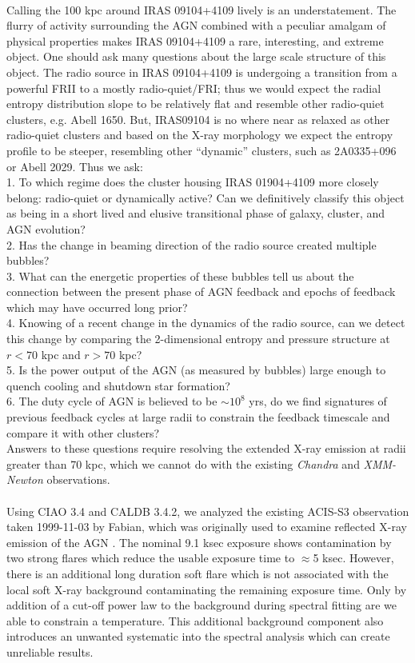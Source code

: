 \documentclass[letterpaper,11pt,twocolumn]{article}
\begin{document}
\\
Calling the 100 kpc around IRAS 09104+4109 lively is an
understatement. The flurry of activity surrounding the AGN combined
with a peculiar amalgam of physical properties makes IRAS 09104+4109 a
rare, interesting, and extreme object. One should ask many questions
about the large scale structure of this object. The radio source in
IRAS 09104+4109 is undergoing a transition from a powerful FRII to a
mostly radio-quiet/FRI; thus we would expect the radial entropy
distribution slope to be relatively flat and resemble other
radio-quiet clusters, e.g. Abell 1650. But, IRAS09104 is no where near
as relaxed as other radio-quiet clusters and based on the X-ray
morphology we expect the entropy profile to be steeper, resembling
other ``dynamic'' clusters, such as 2A0335+096 or Abell 2029. Thus we
ask:\\
1. To which regime does the cluster housing IRAS 01904+4109 more
closely belong: radio-quiet or dynamically active? Can we definitively
classify this object as being in a short lived and elusive
transitional phase of galaxy, cluster, and AGN evolution?\\
2. Has the change in beaming direction of the radio source created
multiple bubbles?\\
3. What can the energetic properties of these bubbles
tell us about the connection between the present phase of AGN feedback
and epochs of feedback which may have occurred long prior?\\
4. Knowing of a recent change in the dynamics of the radio source, can
we detect this change by comparing the 2-dimensional entropy and
pressure structure at $r < 70$ kpc and $r > 70$ kpc?\\
5. Is the power output of the AGN (as measured by bubbles) large
enough to quench cooling and shutdown star formation?\\
6. The duty cycle of AGN is believed to be $\sim 10^8$ yrs, do we
find signatures of previous feedback cycles at large radii to
constrain the feedback timescale and compare it with other clusters?\\
Answers to these questions require resolving the extended X-ray
emission at radii greater than 70 kpc, which we cannot do with the
existing {\textit{Chandra}} and {\it{XMM-Newton}} observations.\\

\\
Using CIAO 3.4 and CALDB 3.4.2, we analyzed the existing ACIS-S3
observation taken 1999-11-03 by Fabian, which was originally used to
examine reflected X-ray emission of the AGN
\citep{2001MNRAS.321L..15I}. The nominal 9.1 ksec exposure shows
contamination by two strong flares which reduce the usable exposure
time to $\approx$5 ksec. However, there is an additional long duration
soft flare which is not associated with the local soft X-ray
background contaminating the remaining exposure time. Only by
addition of a cut-off power law to the background during spectral
fitting are we able to constrain a temperature. This additional
background component also introduces an unwanted systematic into the
spectral analysis which can create unreliable results.
\end{document}
